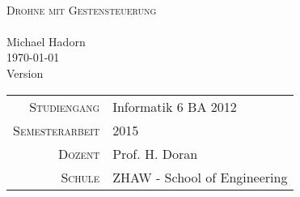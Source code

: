 




\begin{titlepage}
	\mbox{}\vspace{5\baselineskip}\\
	\rmfamily\huge
	\centering
	\textsc{Drohne mit Gestensteuerung} \\
	\mbox{}\vspace{1\baselineskip}\\
	Michael Hadorn\\
	\vspace{2\baselineskip}
	\rmfamily\Large
	\today\\
	Version \mbox{} \\
	\normalsize
	
	\vfill

	\begin{center}
		\begin{tabular}[h]{ r l }
			\textsc{\small{Studiengang}} & Informatik 6 BA 2012\\
			\textsc{\small{Semesterarbeit}} & 2015\\
			\textsc{\small{Dozent}} & Prof. H. Doran\\
			\textsc{\small{Schule}} & ZHAW - School of Engineering\\
		\end{tabular}
	\end{center}

\end{titlepage}

 


